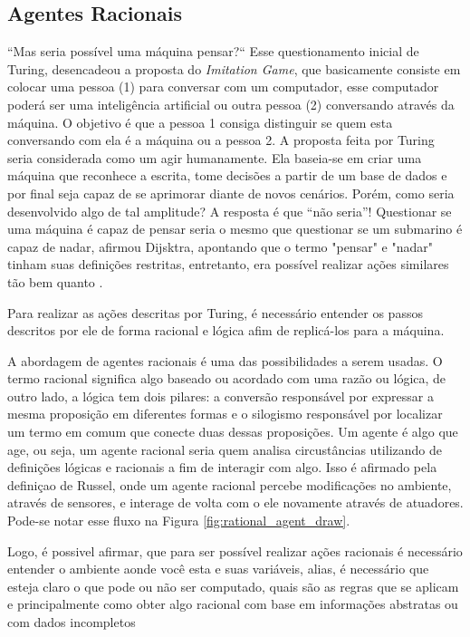 \subsection{Agentes Racionais}
“Mas seria possível uma máquina pensar?“ Esse questionamento inicial de Turing, desencadeou a proposta do \textit{Imitation Game}, que basicamente consiste em colocar uma pessoa (1) para conversar com um computador, esse computador poderá ser uma inteligência artificial ou outra pessoa (2) conversando através da máquina. O objetivo é que a pessoa 1 consiga distinguir se quem esta conversando com ela é a máquina ou a pessoa 2. A proposta feita por Turing seria considerada como um agir humanamente. Ela baseia-se em criar uma máquina que reconhece a escrita, tome decisões a partir de um base de dados e por final seja capaz de se aprimorar diante de novos cenários. Porém, como seria desenvolvido algo de tal amplitude? A resposta é que “não seria”! Questionar se uma máquina é capaz de pensar seria o mesmo que questionar se um submarino é capaz de nadar, afirmou Dijsktra, apontando que o termo "pensar" e "nadar" tinham suas definições restritas, entretanto, era possível realizar ações similares tão bem quanto \cite[2-3]{dijkstra898, turing1950, russell2003artificial}.

Para realizar as ações descritas por Turing, é necessário entender os passos descritos por ele de forma racional e lógica afim de replicá-los para a máquina.

A abordagem de agentes racionais é uma das possibilidades a serem usadas. O termo racional significa algo baseado ou acordado com uma razão ou lógica, de outro lado, a lógica tem dois pilares: a conversão responsável por expressar a mesma proposição em diferentes formas e o silogismo responsável por localizar um termo em comum que conecte duas dessas proposições. Um agente é algo que age, ou seja, um agente racional seria quem analisa circustâncias utilizando de definições lógicas e racionais a fim de interagir com algo. Isso é afirmado pela definiçao de Russel\cite[7]{russell2003artificial}, onde um agente racional percebe modificações no ambiente, através de sensores, e interage de volta com o ele novamente através de atuadores. Pode-se notar esse fluxo na Figura \ref{fig:rational_agent_draw}.

Logo, é possivel afirmar, que para ser possível realizar ações racionais é necessário entender o ambiente aonde você esta e suas variáveis, alias, é necessário que esteja claro o que pode ou não ser computado, quais são as regras que se aplicam e principalmente como obter algo racional com base em informações abstratas ou com dados incompletos \cite{frege1956thought, wooldridge1994agent, simon1955behavioral, boole1854investigation, russell2003artificial}

